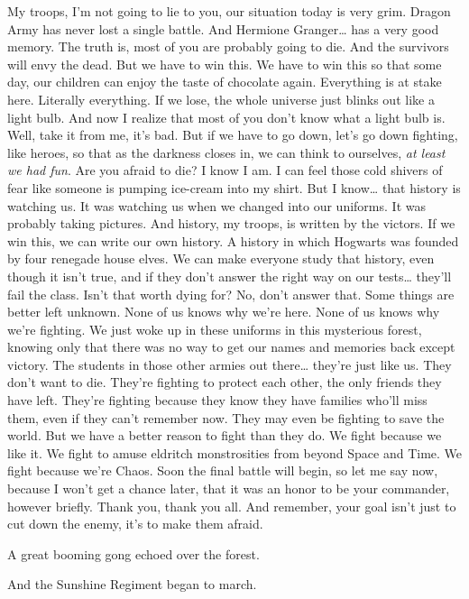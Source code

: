 My troops, I'm not going to lie to you, our situation today is very grim. Dragon Army has never lost a single battle. And Hermione Granger{\ldots} has a very good memory. The truth is, most of you are probably going to die. And the survivors will envy the dead. But we have to win this. We have to win this so that some day, our children can enjoy the taste of chocolate again. Everything is at stake here. Literally everything. If we lose, the whole universe just blinks out like a light bulb. And now I realize that most of you don't know what a light bulb is. Well, take it from me, it's bad. But if we have to go down, let's go down fighting, like heroes, so that as the darkness closes in, we can think to ourselves, \emph{at least we had fun}. Are you afraid to die? I know I am. I can feel those cold shivers of fear like someone is pumping ice-cream into my shirt. But I know{\ldots} that history is watching us. It was watching us when we changed into our uniforms. It was probably taking pictures. And history, my troops, is written by the victors. If we win this, we can write our own history. A history in which Hogwarts was founded by four renegade house elves. We can make everyone study that history, even though it isn't true, and if they don't answer the right way on our tests{\ldots} they'll fail the class. Isn't that worth dying for? No, don't answer that. Some things are better left unknown. None of us knows why we're here. None of us knows why we're fighting. We just woke up in these uniforms in this mysterious forest, knowing only that there was no way to get our names and memories back except victory. The students in those other armies out there{\ldots} they're just like us. They don't want to die. They're fighting to protect each other, the only friends they have left. They're fighting because they know they have families who'll miss them, even if they can't remember now. They may even be fighting to save the world. But we have a better reason to fight than they do. We fight because we like it. We fight to amuse eldritch monstrosities from beyond Space and Time. We fight because we're Chaos. Soon the final battle will begin, so let me say now, because I won't get a chance later, that it was an honor to be your commander, however briefly. Thank you, thank you all. And remember, your goal isn't just to cut down the enemy, it's to make them afraid.

\later

A great booming gong echoed over the forest.

And the Sunshine Regiment began to march.

